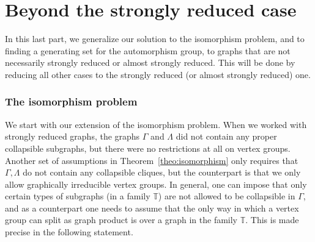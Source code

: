 \documentclass[a4paper,english,11pt]{article}
\theoremstyle{definition}
\theoremstyle{remark}
\begin{document}
\part{Beyond the strongly reduced case}\label{part:3}
In this last part, we generalize our solution to the isomorphism problem, and to finding a generating set for the automorphism group,  to graphs that are not necessarily strongly reduced or almost strongly reduced. This will be done by reducing all other cases to the strongly reduced (or almost strongly reduced) one.

\section{The isomorphism problem}\label{sec:3.1}

We start with our extension of the isomorphism problem. {When we worked with strongly reduced graphs, the graphs $\Gamma$ and $\Lambda$ did not contain any proper collapsible subgraphs, but there were no restrictions at all on vertex groups. Another set of assumptions in Theorem~\ref{theo:isomorphism} only requires that $\Gamma,\Lambda$ do not contain any collapsible cliques, but the counterpart is that we only allow graphically irreducible vertex groups. In general, one can impose that only certain types of subgraphs (in a family $\mathbb{T}$) are not allowed to be collapsible in $\Gamma$, and as a counterpart one needs to assume that the only way in which a vertex group can split as graph product is over a graph in the family $\mathbb{T}$. This is made precise in the following statement.}   
\end{document}
